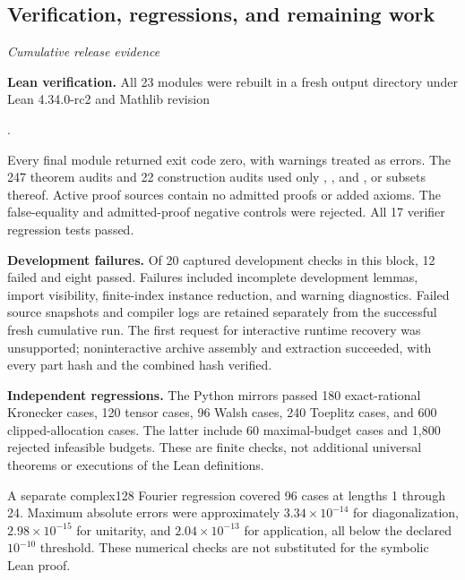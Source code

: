 \subsection{Verification, regressions, and remaining work}\label{supp4:subsection:007}\textit{Cumulative release evidence}\par
\textbf{Lean verification.} All 23 modules were rebuilt in a fresh output directory under Lean 4.34.0-rc2 and Mathlib revision
\begin{center}.\end{center}
Every final module returned exit code zero, with warnings treated as errors. The 247 theorem audits and 22 construction audits used only , , and , or subsets thereof. Active proof sources contain no admitted proofs or added axioms. The false-equality and admitted-proof negative controls were rejected. All 17 verifier regression tests passed.

\textbf{Development failures.} Of 20 captured development checks in this block, 12 failed and eight passed. Failures included incomplete development lemmas, import visibility, finite-index instance reduction, and warning diagnostics. Failed source snapshots and compiler logs are retained separately from the successful fresh cumulative run. The first request for interactive runtime recovery was unsupported; noninteractive archive assembly and extraction succeeded, with every part hash and the combined hash verified.

\textbf{Independent regressions.} The Python mirrors passed 180 exact-rational Kronecker cases, 120 tensor cases, 96 Walsh cases, 240 Toeplitz cases, and 600 clipped-allocation cases. The latter include 60 maximal-budget cases and 1,800 rejected infeasible budgets. These are finite checks, not additional universal theorems or executions of the Lean definitions.

A separate complex128 Fourier regression covered 96 cases at lengths 1 through 24. Maximum absolute errors were approximately $3.34\times10^{-14}$ for diagonalization, $2.98\times10^{-15}$ for unitarity, and $2.04\times10^{-13}$ for application, all below the declared $10^{-10}$ threshold. These numerical checks are not substituted for the symbolic Lean proof.

